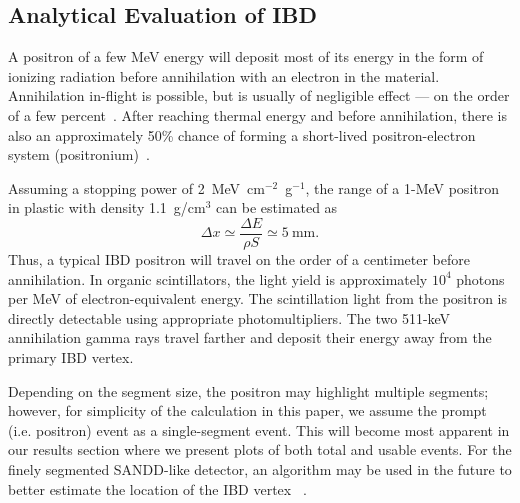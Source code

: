 \documentclass[tightenlines,
twocolumn,prl,notitlepage,nofootinbib,preprintnumbers,longbibliography]{revtex4-1}
\begin{document}
\subsection{Analytical Evaluation of IBD}\label{subsec:analytical_eval}
A positron of a few MeV energy will deposit most of its energy in the form of ionizing radiation before annihilation with an electron in the material. Annihilation in-flight is possible, but is usually of negligible effect --- on the order of a few percent~\cite{2017EPJWC.14608010S}. After reaching thermal energy and before annihilation, there is also an approximately 50\% chance of forming a short-lived positron-electron system (positronium)~\cite{DoubleChooz:2014iyf}. 


Assuming a stopping power of 2~MeV~cm$^{-2}$~g$^{-1}$, the range of a 1-MeV positron in plastic with density 1.1~g/cm$^3$ can be estimated as
\[
\Delta x \simeq \frac{\Delta E}{\rho S} \simeq 5~\text{mm}.
\]
Thus, a typical IBD positron will travel on the order of a centimeter before annihilation. In organic scintillators, the light yield is approximately $10^4$ photons per MeV of electron-equivalent energy. The scintillation light from the positron is directly detectable using appropriate photomultipliers. The two 511-keV annihilation gamma rays travel farther and deposit their energy away from the primary IBD vertex.

Depending on the segment size, the positron may highlight multiple segments; however, for simplicity of the calculation in this paper, we assume the prompt (i.e. positron) event as a single-segment event. This will become most apparent in our results section where we present plots of both total and usable events. %
For the finely segmented SANDD-like detector, an algorithm may be used in the future to better estimate the location of the IBD vertex ~\cite{Sutanto:2021xpo}.
\end{document}
